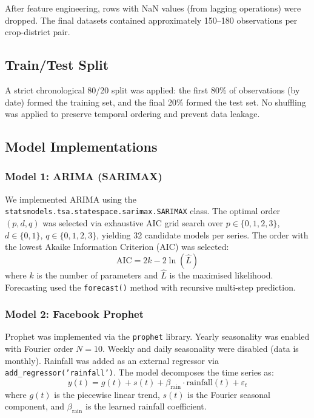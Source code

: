 \documentclass[12pt,a4paper]{article}
\begin{document}
After feature engineering, rows with NaN values (from lagging operations) were dropped. The final datasets contained approximately 150--180 observations per crop-district pair.

\subsection{Train/Test Split}
A strict chronological 80/20 split was applied: the first 80\% of observations (by date) formed the training set, and the final 20\% formed the test set. No shuffling was applied to preserve temporal ordering and prevent data leakage.

\subsection{Model Implementations}

\subsubsection{Model 1: ARIMA (SARIMAX)}
We implemented ARIMA using the \texttt{statsmodels.tsa.statespace.sarimax.SARIMAX} class. The optimal order $(p, d, q)$ was selected via exhaustive AIC grid search over $p \in \{0, 1, 2, 3\}$, $d \in \{0, 1\}$, $q \in \{0, 1, 2, 3\}$, yielding 32 candidate models per series. The order with the lowest Akaike Information Criterion (AIC) was selected:
\begin{equation}
    \text{AIC} = 2k - 2\ln(\hat{L})
\end{equation}
where $k$ is the number of parameters and $\hat{L}$ is the maximised likelihood. Forecasting used the \texttt{forecast()} method with recursive multi-step prediction.

\subsubsection{Model 2: Facebook Prophet}
Prophet was implemented via the \texttt{prophet} library. Yearly seasonality was enabled with Fourier order $N = 10$. Weekly and daily seasonality were disabled (data is monthly). Rainfall was added as an external regressor via \texttt{add\_regressor('rainfall')}. The model decomposes the time series as:
\begin{equation}
    y(t) = g(t) + s(t) + \beta_{\text{rain}} \cdot \text{rainfall}(t) + \varepsilon_t
\end{equation}
where $g(t)$ is the piecewise linear trend, $s(t)$ is the Fourier seasonal component, and $\beta_{\text{rain}}$ is the learned rainfall coefficient.
\end{document}
